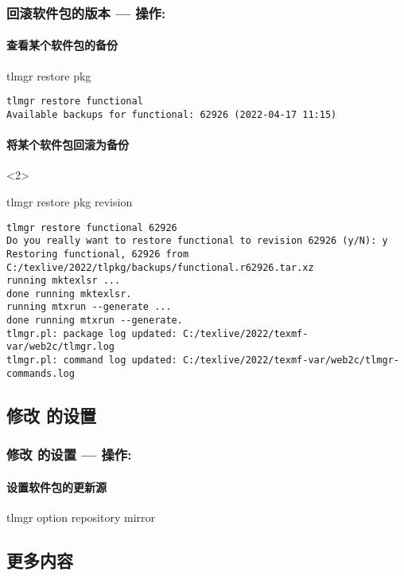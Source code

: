 \begin{frame}[fragile]
  \frametitle{回滚软件包的版本 --- 操作: }
  
  \framesubtitle<1>{查看某个软件包的备份} 
\begin{cmdcode}
tlmgr restore pkg
\end{cmdcode}
\begin{lstlisting}[basicstyle=\tiny\ttfamily, frame=single]
tlmgr restore functional
Available backups for functional: 62926 (2022-04-17 11:15)
\end{lstlisting}
  \framesubtitle<2>{将某个软件包回滚为备份}

\begin{uncoverenv}<2>
\begin{cmdcode}
tlmgr restore pkg revision
\end{cmdcode}
\begin{lstlisting}[basicstyle=\tiny\ttfamily, frame=single]
tlmgr restore functional 62926
Do you really want to restore functional to revision 62926 (y/N): y
Restoring functional, 62926 from C:/texlive/2022/tlpkg/backups/functional.r62926.tar.xz
running mktexlsr ...
done running mktexlsr.
running mtxrun --generate ...
done running mtxrun --generate.
tlmgr.pl: package log updated: C:/texlive/2022/texmf-var/web2c/tlmgr.log
tlmgr.pl: command log updated: C:/texlive/2022/texmf-var/web2c/tlmgr-commands.log
\end{lstlisting}
\end{uncoverenv}
\end{frame}

\subsection{修改 \tlmgr 的设置}

\begin{frame}[fragile]
  \frametitle{修改 \tlmgr 的设置 --- 操作: }
  \framesubtitle{设置软件包的更新源}
\begin{cmdcode}
tlmgr option repository mirror
\end{cmdcode}
\end{frame}

\subsection{更多内容}


